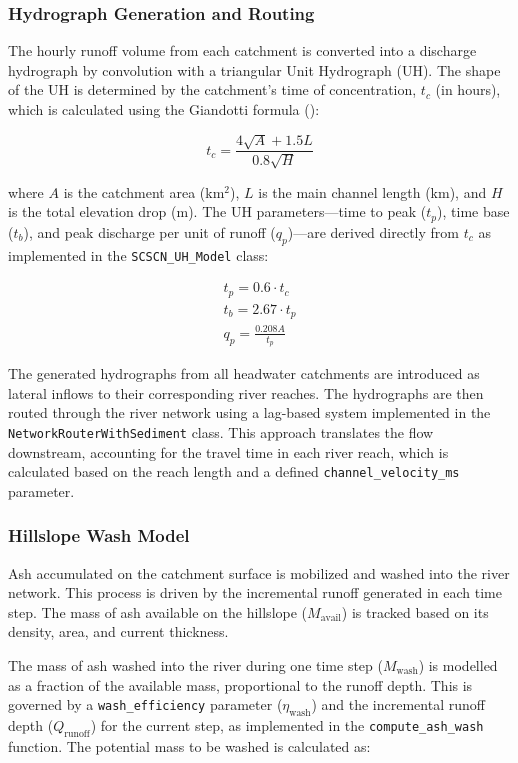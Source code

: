 \documentclass[12pt, a4paper]{article}
\begin{document}
\subsubsection{Hydrograph Generation and Routing}
The hourly runoff volume from each catchment is converted into a discharge hydrograph by convolution with a triangular Unit Hydrograph (UH). The shape of the UH is determined by the catchment's time of concentration, $t_c$ (in hours), which is calculated using the Giandotti formula (\citealp{Chow1988}):

\begin{equation}
t_c = \frac{4\sqrt{A} + 1.5L}{0.8\sqrt{H}}
\end{equation}

where $A$ is the catchment area (km$^2$), $L$ is the main channel length (km), and $H$ is the total elevation drop (m). The UH parameters—time to peak ($t_p$), time base ($t_b$), and peak discharge per unit of runoff ($q_p$)—are derived directly from $t_c$ as implemented in the \texttt{SCSCN\_UH\_Model} class:

\begin{gather}
t_p = 0.6 \cdot t_c \\
t_b = 2.67 \cdot t_p \\
q_p = \frac{0.208 A}{t_p}
\end{gather}

The generated hydrographs from all headwater catchments are introduced as lateral inflows to their corresponding river reaches. The hydrographs are then routed through the river network using a lag-based system implemented in the \texttt{NetworkRouterWithSediment} class. This approach translates the flow downstream, accounting for the travel time in each river reach, which is calculated based on the reach length and a defined \texttt{channel\_velocity\_ms} parameter.

\subsubsection{Hillslope Wash Model}
Ash accumulated on the catchment surface is mobilized and washed into the river network. This process is driven by the incremental runoff generated in each time step. The mass of ash available on the hillslope ($M_{\text{avail}}$) is tracked based on its density, area, and current thickness.

The mass of ash washed into the river during one time step ($M_{\text{wash}}$) is modelled as a fraction of the available mass, proportional to the runoff depth. This is governed by a \texttt{wash\_efficiency} parameter ($\eta_{\text{wash}}$) and the incremental runoff depth ($Q_{\text{runoff}}$) for the current step, as implemented in the \texttt{compute\_ash\_wash} function. The potential mass to be washed is calculated as:
\end{document}
